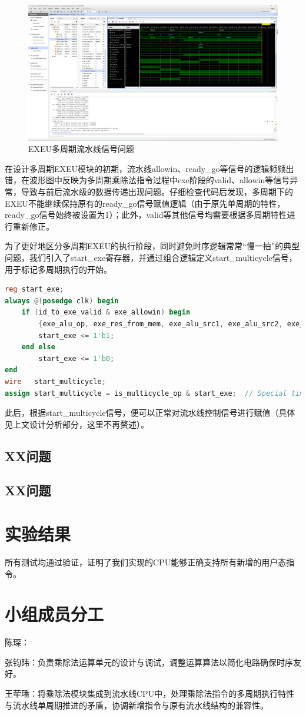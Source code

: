 \documentclass[11pt]{article}
\begin{document}
\begin{figure}[H]
  \centering
  \includegraphics[width=\textwidth]{fig/exeu_multicycle_error.png}
  \caption{EXEU多周期流水线信号问题}
  \label{fig:exeu_multicycle_error}
\end{figure}

在设计多周期EXEU模块的初期，流水线allowin、ready\_go等信号的逻辑频频出错，在波形图中反映为多周期乘除法指令过程中exe阶段的valid、allowin等信号异常，导致与前后流水级的数据传递出现问题。仔细检查代码后发现，多周期下的EXEU不能继续保持原有的ready\_go信号赋值逻辑（由于原先单周期的特性，ready\_go信号始终被设置为1）；此外，valid等其他信号均需要根据多周期特性进行重新修正。

为了更好地区分多周期EXEU的执行阶段，同时避免时序逻辑常常“慢一拍”的典型问题，我们引入了start\_exe寄存器，并通过组合逻辑定义start\_multicycle信号，用于标记多周期执行的开始。

\begin{lstlisting}[language=verilog]
reg start_exe;
always @(posedge clk) begin
    if (id_to_exe_valid & exe_allowin) begin
        {exe_alu_op, exe_res_from_mem, exe_alu_src1, exe_alu_src2, exe_mem_op, exe_rf_we, exe_rf_waddr, exe_rkd_value, exe_pc} <= id_to_exe_zip;
        start_exe <= 1'b1;
    end else
        start_exe <= 1'b0;
end
wire   start_multicycle;
assign start_multicycle = is_multicycle_op & start_exe;  // Special time stamp
\end{lstlisting}

此后，根据start\_multicycle信号，便可以正常对流水线控制信号进行赋值（具体见上文设计分析部分，这里不再赘述）。

\subsection{XX问题}

\subsection{XX问题}

\section{实验结果}


所有测试均通过验证，证明了我们实现的CPU能够正确支持所有新增的用户态指令。


\section{小组成员分工}

陈琛：

张钧玮：负责乘除法运算单元的设计与调试，调整运算算法以简化电路确保时序友好。

王荦璠：将乘除法模块集成到流水线CPU中，处理乘除法指令的多周期执行特性与流水线单周期推进的矛盾，协调新增指令与原有流水线结构的兼容性。
\end{document}
